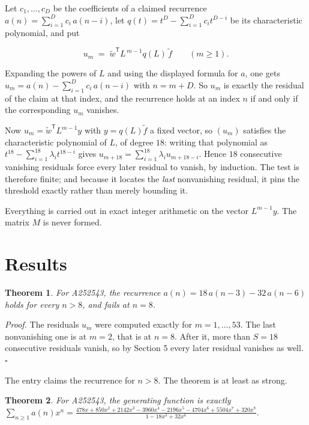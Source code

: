 \documentclass[11pt]{article}
\newtheorem{theorem}{Theorem}
\theoremstyle{definition}
\begin{document}
Let $c_1,\dots,c_D$ be the coefficients of a claimed recurrence $a(n) = \sum_{i=1}^{D} c_i\,a(n-i)$, let $q(t) = t^{D} - \sum_{i=1}^{D} c_i t^{D-i}$ be its characteristic polynomial, and put

\[u_m \;=\; \tilde w^{\mathsf T} L^{\,m-1} q(L)\,\tilde f \qquad (m \ge 1).\]

Expanding the powers of $L$ and using the displayed formula for $a$, one gets $u_m = a(n) - \sum_{i=1}^{D} c_i\,a(n-i)$ with $n = m + D$. So $u_m$ is exactly the residual of the claim at that index, and the recurrence holds at an index $n$ if and only if the corresponding $u_m$ vanishes.

Now $u_m = \tilde w^{\mathsf T} L^{m-1} y$ with $y = q(L)\tilde f$ a fixed vector, so $(u_m)$ satisfies the characteristic polynomial of $L$, of degree $18$: writing that polynomial as $t^{18} - \sum_{i=1}^{18} \lambda_i t^{18-i}$ gives $u_{m+18} = \sum_{i=1}^{18} \lambda_i u_{m+18-i}$. Hence $18$ consecutive vanishing residuals force every later residual to vanish, by induction. The test is therefore finite; and because it locates the {\itshape last} nonvanishing residual, it pins the threshold exactly rather than merely bounding it.

Everything is carried out in exact integer arithmetic on the vector $L^{m-1}y$. The matrix $M$ is never formed.

\section{Results}

\begin{theorem} For A252543, the recurrence $a(n) = 18\,a(n-3) - 32\,a(n-6)$ holds for every $n > 8$, and fails at $n = 8$.\end{theorem}

{\itshape Proof.} The residuals $u_m$ were computed exactly for $m = 1,\dots,53$. The last nonvanishing one is at $m = 2$, that is at $n = 8$. After it, more than $S = 18$ consecutive residuals vanish, so by Section 5 every later residual vanishes as well. $\square$

The entry claims the recurrence for $n > 8$. The theorem is at least as strong.

\begin{theorem} For A252543, the generating function is exactly $\sum_{n\ge 1} a(n)x^n = \frac{478x + 850x^{2} + 2142x^{3} - 3960x^{4} - 2196x^{5} - 4704x^{6} + 5504x^{7} + 320x^{8}}{1 - 18x^{3} + 32x^{6}}$.\end{theorem}
\end{document}
